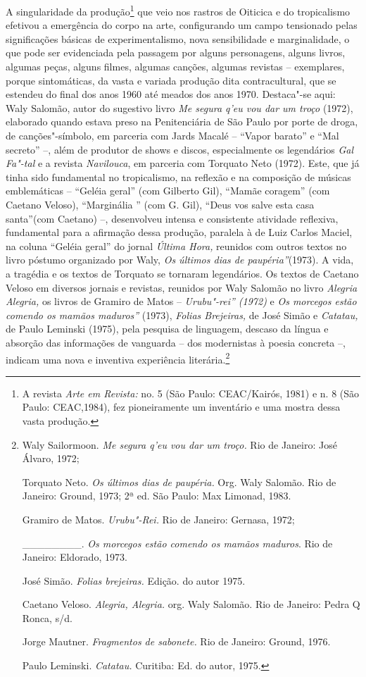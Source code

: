 A singularidade da produção\footnote{A revista \emph{Arte em Revista:}
  no. 5 (São Paulo: \textsc{CEAC}/Kairós, 1981) e n. 8 (São Paulo: \textsc{CEAC},1984),
  fez pioneiramente um inventário e uma mostra dessa vasta produção.}
que veio nos rastros de Oiticica e do tropicalismo efetivou a emergência
do corpo na arte, configurando um campo tensionado pelas significações
básicas de experimentalismo, nova sensibilidade e marginalidade, o que
pode ser evidenciada pela passagem por alguns personagens, alguns
livros, algumas peças, alguns filmes, algumas canções, algumas revistas
-- exemplares, porque sintomáticas, da vasta e variada produção dita
contracultural, que se estendeu do final dos anos 1960 até meados dos
anos 1970. Destaca"-se aqui: Waly Salomão, autor do sugestivo livro
\emph{Me segura q'eu vou dar um troço} (1972), elaborado quando
estava preso na Penitenciária de São Paulo por porte de droga, de
canções"-símbolo, em parceria com Jards Macalé -- ``Vapor barato'' e ``Mal
secreto'' --, além de produtor de shows e discos, especialmente os
legendários \emph{Gal Fa"-tal} e a revista \emph{Navilouca}, em parceria
com Torquato Neto (1972). Este, que já tinha sido fundamental no
tropicalismo, na reflexão e na composição de músicas emblemáticas --
``Geléia geral'' (com Gilberto Gil), ``Mamãe coragem'' (com Caetano
Veloso), ``Marginália '' (com G. Gil), ``Deus vos salve esta casa
santa''(com Caetano) --, desenvolveu intensa e consistente atividade
reflexiva, fundamental para a afirmação dessa produção, paralela à de
Luiz Carlos Maciel, na coluna ``Geléia geral'' do jornal \emph{Última
Hora,} reunidos com outros textos no livro póstumo organizado por Waly,
\emph{Os últimos dias de paupéria''}(1973). A vida, a tragédia e os
textos de Torquato se tornaram legendários. Os textos de Caetano Veloso
em diversos jornais e revistas, reunidos por Waly Salomão no livro
\emph{Alegria Alegria,} os livros de Gramiro de Matos --
\emph{Urubu"-rei'' (1972)} e \emph{Os morcegos estão comendo os mamãos
maduros''} (1973), \emph{Folias Brejeiras,} de José Simão e
\emph{Catatau,} de Paulo Leminski (1975), pela pesquisa de linguagem,
descaso da língua e absorção das informações de vanguarda -- dos
modernistas à poesia concreta --, indicam uma nova e inventiva
experiência literária.\footnote{Waly Sailormoon. \emph{Me segura q'eu
  vou dar um troço.} Rio de Janeiro: José Álvaro, 1972;

  Torquato Neto. \emph{Os últimos dias de paupéria.} Org. Waly Salomão.
  Rio de Janeiro: Ground, 1973; 2ª ed. São Paulo: Max Limonad, 1983.

  Gramiro de Matos. \emph{Urubu"-Rei.} Rio de Janeiro: Gernasa, 1972;

  \_\_\_\_\_\_\_\_. \emph{Os morcegos estão comendo os mamãos maduros}.
  Rio de Janeiro: Eldorado, 1973.

  José Simão. \emph{Folias brejeiras.} Edição. do autor 1975.

  Caetano Veloso. \emph{Alegria, Alegria.} org. Waly Salomão. Rio de
  Janeiro: Pedra Q Ronca, s/d.

  Jorge Mautner. \emph{Fragmentos de sabonete.} Rio de Janeiro: Ground,
  1976.

  Paulo Leminski. \emph{Catatau.} Curitiba: Ed. do autor, 1975.}

